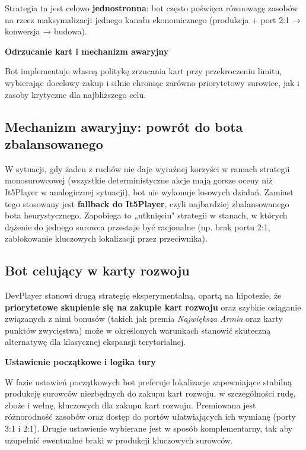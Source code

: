 \documentclass[polish,inz,longabstract]{iithesis}
\begin{document}
Strategia ta jest celowo \textbf{jednostronna}: bot często poświęca równowagę zasobów na rzecz maksymalizacji jednego kanału ekonomicznego (produkcja + port 2:1 → konwersja → budowa).

\medskip
\textbf{Odrzucanie kart i mechanizm awaryjny}

Bot implementuje własną politykę zrzucania kart przy przekroczeniu limitu, wybierając docelowy zakup i silnie chroniąc zarówno priorytetowy surowiec, jak i zasoby krytyczne dla najbliższego celu.

\subsection{Mechanizm awaryjny: powrót do bota zbalansowanego}

W sytuacji, gdy żaden z ruchów nie daje wyraźnej korzyści w ramach strategii monosurowcowej (wszystkie deterministyczne akcje mają gorsze oceny niż It5Player w analogicznej sytuacji), bot nie wykonuje losowych działań. Zamiast tego stosowany jest \textbf{fallback do It5Player}, czyli najbardziej zbalansowanego bota heurystycznego. Zapobiega to „utknięciu" strategii w stanach, w których dążenie do jednego surowca przestaje być racjonalne (np. brak portu 2:1, zablokowanie kluczowych lokalizacji przez przeciwnika).

\medskip
\subsection{Bot celujący w karty rozwoju}
\label{sec:devplayer}

DevPlayer stanowi drugą strategię eksperymentalną, opartą na hipotezie, że \textbf{priorytetowe skupienie się na zakupie kart rozwoju} oraz szybkie osiąganie związanych z nimi bonusów (takich jak premia \textit{Największa Armia} oraz karty punktów zwycięstwa) może w określonych warunkach stanowić skuteczną alternatywę dla klasycznej ekspansji terytorialnej.

\medskip
\textbf{Ustawienie początkowe i logika tury}

W fazie ustawień początkowych bot preferuje lokalizacje zapewniające stabilną produkcję surowców niezbędnych do zakupu kart rozwoju, w szczególności rudę, zboże i wełnę, kluczowych dla zakupu kart rozwoju. Premiowana jest różnorodność zasobów oraz dostęp do portów ułatwiających ich wymianę (porty 3:1 i 2:1). Drugie ustawienie wybierane jest w sposób komplementarny, tak aby uzupełnić ewentualne braki w produkcji kluczowych surowców.
\end{document}
